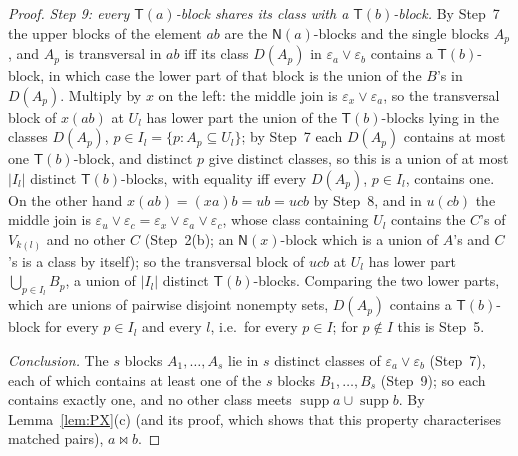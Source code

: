 \documentclass[11pt]{amsart}
\theoremstyle{definition}
\newcommand{\supp}{\operatorname{supp}}
\newcommand{\T}{\mathsf{T}}
\newcommand{\N}{\mathsf{N}}
\newcommand{\mt}{\bowtie}   %
\begin{document}
\begin{proof}
\emph{Step 9: every $\T(a)$-block shares its class with a $\T(b)$-block.} By Step~7 the upper blocks of the element $ab$ are the $\N(a)$-blocks and the single blocks $A_p$, and $A_p$ is transversal in $ab$ iff its class $D(A_p)$ in $\varepsilon_a\vee\varepsilon_b$ contains a $\T(b)$-block, in which case the lower part of that block is the union of the $B$'s in $D(A_p)$. Multiply by $x$ on the left: the middle join is $\varepsilon_x\vee\varepsilon_a$, so the transversal block of $x(ab)$ at $U_l$ has lower part the union of the $\T(b)$-blocks lying in the classes $D(A_p)$, $p\in I_l=\{p:A_p\subseteq U_l\}$; by Step~7 each $D(A_p)$ contains at most one $\T(b)$-block, and distinct $p$ give distinct classes, so this is a union of at most $|I_l|$ distinct $\T(b)$-blocks, with equality iff every $D(A_p)$, $p\in I_l$, contains one. On the other hand $x(ab)=(xa)b=ub=ucb$ by Step~8, and in $u(cb)$ the middle join is $\varepsilon_u\vee\varepsilon_c=\varepsilon_x\vee\varepsilon_a\vee\varepsilon_c$, whose class containing $U_l$ contains the $C$'s of $V_{k(l)}$ and no other $C$ (Step~2(b); an $\N(x)$-block which is a union of $A$'s and $C$'s is a class by itself); so the transversal block of $ucb$ at $U_l$ has lower part $\bigcup_{p\in I_l}B_p$, a union of $|I_l|$ distinct $\T(b)$-blocks. Comparing the two lower parts, which are unions of pairwise disjoint nonempty sets, $D(A_p)$ contains a $\T(b)$-block for every $p\in I_l$ and every $l$, i.e.\ for every $p\in I$; for $p\notin I$ this is Step~5.

\emph{Conclusion.} The $s$ blocks $A_1,\dots,A_s$ lie in $s$ distinct classes of $\varepsilon_a\vee\varepsilon_b$ (Step~7), each of which contains at least one of the $s$ blocks $B_1,\dots,B_s$ (Step~9); so each contains exactly one, and no other class meets $\supp a\cup\supp b$. By Lemma~\ref{lem:PX}(c) (and its proof, which shows that this property characterises matched pairs), $a\mt b$.
\end{proof}
\end{document}
